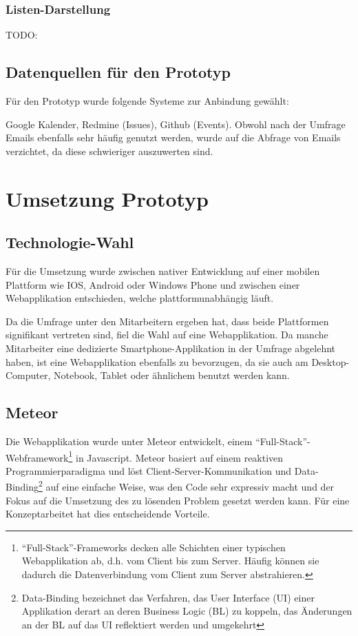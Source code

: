 \documentclass[]{article}
\begin{document}
\subsubsection{Listen-Darstellung}\label{listen-darstellung}

TODO:

\subsection{Datenquellen für den
Prototyp}\label{datenquellen-fuxfcr-den-prototyp}

Für den Prototyp wurde folgende Systeme zur Anbindung gewählt:

Google Kalender, Redmine (Issues), Github (Events). Obwohl nach der
Umfrage Emails ebenfalls sehr häufig genutzt werden, wurde auf die
Abfrage von Emails verzichtet, da diese schwieriger auszuwerten sind.

\newpage

\section{Umsetzung Prototyp}\label{umsetzung-prototyp}

\subsection{Technologie-Wahl}\label{technologie-wahl}

Für die Umsetzung wurde zwischen nativer Entwicklung auf einer mobilen
Plattform wie IOS, Android oder Windows Phone und zwischen einer
Webapplikation entschieden, welche plattformunabhängig läuft.

Da die Umfrage unter den Mitarbeitern ergeben hat, dass beide
Plattformen signifikant vertreten sind, fiel die Wahl auf eine
Webapplikation. Da manche Mitarbeiter eine dedizierte
Smartphone-Applikation in der Umfrage abgelehnt haben, ist eine
Webapplikation ebenfalls zu bevorzugen, da sie auch am Desktop-Computer,
Notebook, Tablet oder ähnlichem benutzt werden kann.

\subsection{Meteor}\label{meteor}

Die Webapplikation wurde unter Meteor entwickelt, einem
``Full-Stack''-Webframework\footnote{``Full-Stack''-Frameworks decken
  alle Schichten einer typischen Webapplikation ab, d.h. vom Client bis
  zum Server. Häufig können sie dadurch die Datenverbindung vom Client
  zum Server abstrahieren.} in Javascript. Meteor basiert auf einem
reaktiven Programmierparadigma und löst Client-Server-Kommunikation und
Data-Binding\footnote{Data-Binding bezeichnet das Verfahren, das User
  Interface (UI) einer Applikation derart an deren Business Logic (BL)
  zu koppeln, das Änderungen an der BL auf das UI reflektiert werden und
  umgekehrt} auf eine einfache Weise, was den Code sehr expressiv macht
und der Fokus auf die Umsetzung des zu lösenden Problem gesetzt werden
kann. Für eine Konzeptarbeitet hat dies entscheidende Vorteile.
\end{document}
